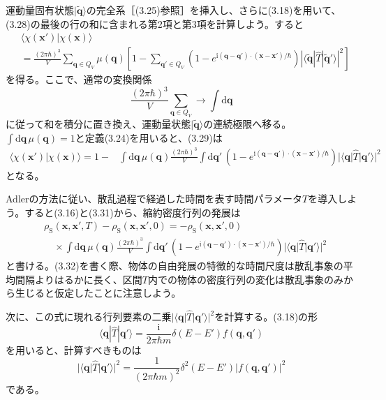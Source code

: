 \hypertarget{srcpage:125}{}\label{srcpage:125}
運動量固有状態$|\widetilde{\bm q}\rangle$の完全系［(3.25)参照］を挿入し、さらに(3.18)を用いて、(3.28)の最後の行の和に含まれる第2項と第3項を計算しよう。すると
\begin{equation}
\begin{aligned}
&\langle\chi(\bm x')|\chi(\bm x)\rangle\\
&=\frac{(2\pi\hbar)^3}{V}\sum_{\bm q\in Q_V}\mu(\bm q)
\left[1-\sum_{\bm q'\in Q_V}\left(1-e^{\mathrm i(\bm q-\bm q')\cdot(\bm x-\bm x')/\hbar}\right)
\left|\langle\widetilde{\bm q}|\hat T|\widetilde{\bm q}'\rangle\right|^2\right]
\end{aligned}\tag{3.29}
\end{equation}
を得る。ここで、通常の変換関係
\begin{equation}
\frac{(2\pi\hbar)^3}{V}\sum_{\bm q\in Q_V}\longrightarrow\int\mathrm d\bm q
\tag{3.30}
\end{equation}
に従って和を積分に置き換え、運動量状態$|\widetilde{\bm q}\rangle$の連続極限へ移る。$\int\mathrm d\bm q\,\mu(\bm q)=1$と定義(3.24)を用いると、(3.29)は
\begin{equation}
\begin{aligned}
\langle\chi(\bm x')|\chi(\bm x)\rangle
=1-&\int\mathrm d\bm q\,\mu(\bm q)\frac{(2\pi\hbar)^3}{V}\int\mathrm d\bm q'\,
\left(1-e^{\mathrm i(\bm q-\bm q')\cdot(\bm x-\bm x')/\hbar}\right)
|\langle\bm q|\hat T|\bm q'\rangle|^2
\end{aligned}\tag{3.31}
\end{equation}
となる。

Adlerの方法\cite{ref161}に従い、散乱過程で経過した時間を表す時間パラメータ$T$を導入しよう。すると(3.16)と(3.31)から、縮約密度行列の発展は
\begin{equation}
\begin{aligned}
&\rho_{\mathrm S}(\bm x,\bm x',T)-\rho_{\mathrm S}(\bm x,\bm x',0)=-\rho_{\mathrm S}(\bm x,\bm x',0)\\
&\quad\times\int\mathrm d\bm q\,\mu(\bm q)\frac{(2\pi\hbar)^3}{V}\int\mathrm d\bm q'\,
\left(1-e^{\mathrm i(\bm q-\bm q')\cdot(\bm x-\bm x')/\hbar}\right)|\langle\bm q|\hat T|\bm q'\rangle|^2
\end{aligned}\tag{3.32}
\end{equation}
と書ける。(3.32)を書く際、物体の自由発展の特徴的な時間尺度は散乱事象の平均間隔よりはるかに長く、区間$T$内での物体の密度行列の変化は散乱事象のみから生じると仮定したことに注意しよう。

次に、この式に現れる行列要素の二乗$|\langle\bm q|\hat T|\bm q'\rangle|^2$を計算する。(3.18)の形
\begin{equation}
\langle\bm q|\hat T|\bm q'\rangle=\frac{\mathrm i}{2\pi\hbar m}\delta(E-E')f(\bm q,\bm q')
\tag{3.33}
\end{equation}
を用いると、計算すべきものは
\begin{equation}
|\langle\bm q|\hat T|\bm q'\rangle|^2=\frac{1}{(2\pi\hbar m)^2}\delta^2(E-E')|f(\bm q,\bm q')|^2
\tag{3.34}
\end{equation}
である。

